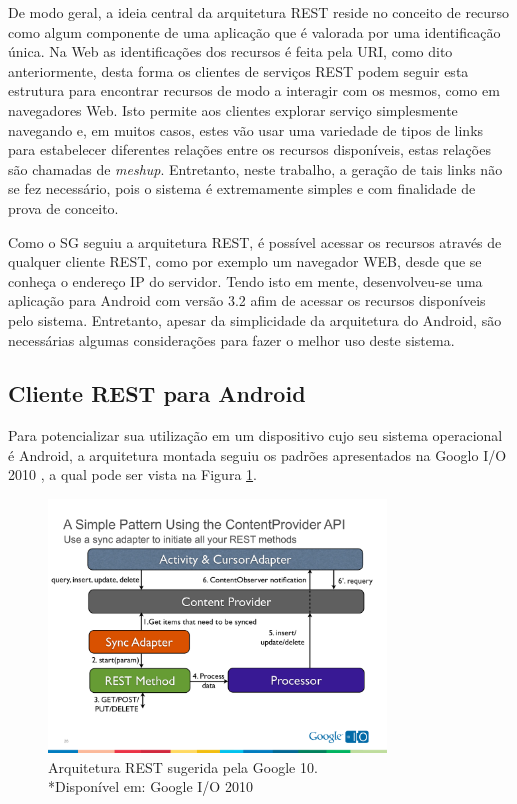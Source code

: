 \documentclass[12pt,a4paper,oneside]{report}
\begin{document}
De modo geral, a ideia central da arquitetura REST reside no conceito de recurso como algum componente de uma aplicação que é valorada por uma identificação única. Na Web as identificações dos recursos é feita pela URI, como dito anteriormente, desta forma os clientes de serviços REST podem seguir esta estrutura para encontrar recursos de modo a interagir com os mesmos, como em navegadores Web. Isto permite aos clientes explorar serviço simplesmente navegando e, em muitos casos, estes vão usar uma variedade de tipos de links para estabelecer diferentes relações entre os recursos disponíveis, estas relações são chamadas de \emph{meshup}. Entretanto, neste trabalho, a geração de tais links não se fez necessário, pois o sistema é extremamente simples e com finalidade de prova de conceito.

Como o SG seguiu a arquitetura REST, é possível acessar os recursos através de qualquer cliente REST, como por exemplo um navegador WEB, desde que se conheça o endereço IP do servidor. Tendo isto em mente, desenvolveu-se uma aplicação para Android com versão 3.2 afim de acessar os recursos disponíveis pelo sistema. Entretanto, apesar da simplicidade da arquitetura do Android, são necessárias algumas considerações para fazer o melhor uso deste sistema.

\subsection{Cliente REST para Android}

Para potencializar sua utilização em um dispositivo cujo seu sistema operacional é Android, a arquitetura montada seguiu os padrões apresentados na Googlo I/O 2010 \cite{restclient}, a qual pode ser vista na Figura \ref{fig:rest_android}.

\begin{figure}[h!]
   \centering
    \includegraphics[width=0.8\textwidth]{figuras/rest_android}
	\caption{Arquitetura REST sugerida pela Google 10. \\ *\footnotesize Disponível em: Google I/O 2010 \cite{restclient}}
    \label{fig:rest_android}
\end{figure}
\end{document}

